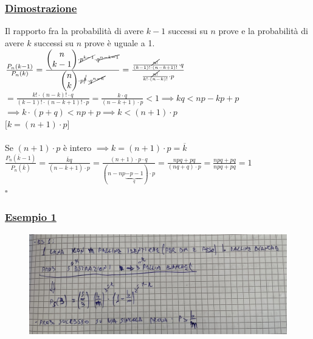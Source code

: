 \documentclass{article}
\begin{document}
\subsubsection{\underline{Dimostrazione}}
Il rapporto fra la probabilità di avere $k-1$ successi su $n$ prove e la probabilità di avere $k$ successi su $n$ prove è uguale a 1. \\
$\frac{P_n(k-1)}{P_n(k)} = \frac{ \left( \begin{matrix} n \\ k-1 \end{matrix}\right) \cdot \cancel {p^{k-1}} \cdot q^{\cancel {n-k-1} } }
{ \left( \begin{matrix} n \\ k \end{matrix}\right) \cdot p^{\cancel k}\cdot \cancel {q^{n-k}} } =  \frac{ \frac{\cancel {n!}}{(k-1)! \cdot (n-k+1)!} \cdot q }
{ \frac{\cancel {n!}}{k! \cdot (n-k)!} \cdot p }$ \\
$=  \frac{ k! \cdot (n-k)! \cdot q }
{ (k-1)! \cdot (n-k+1)! \cdot p } = \frac{k \cdot q}{(n-k+1) \cdot p} < 1
\implies kq < np - kp + p $ \\
$\implies 
k \cdot (p+q) < np + p
\implies
k < (n+1) \cdot p$ \\
$\big[ k = (n+1) \cdot p\big]$ \\ \\
Se $(n+1) \cdot p$ è intero $\implies k = (n+1) \cdot p = \overline k$ \\ 
$\frac{P_n(\overline k-1)}{P_n(\overline k)} = \frac{\overline k q}{(n- \overline k +1) \cdot p} = \frac{(n+1) \cdot p \cdot q}{(n-np \underset{q}{\underbrace{-p-1}} ) \cdot p}
= \frac{npq + pq}{(nq + q)  \cdot p} = \frac{npq + pq}{npq +pq} = 1$ \\
\hspace*{0pt}\hfill $\square$
\newpage
\subsubsection{\underline{Esempio 1}} 
\begin{figure}[ht]
\centering
\includegraphics[scale=0.12]{ese/7.jpeg}
\end{figure}
\end{document}
